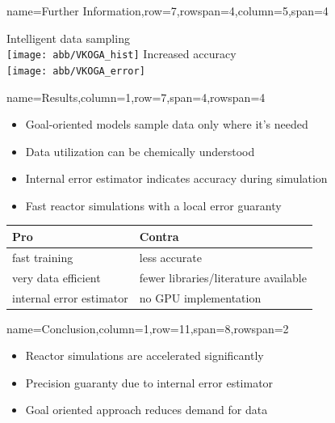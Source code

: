 \documentclass[
	accentcolor=3c,
	boxstyle=colored, %
	colorback=false,
	title=small
	]{tudasciposter}
\begin{document}
\begin{tcbposter}[
	poster={
		columns=8,
		rows=12,
		spacing=1cm,
	},]
\begin{posterboxenv}{name=Further Information,row=7,rowspan=4,column=5,span=4}
	\begin{multicols}{2}
		{\Large \centering Intelligent data sampling\\}
		\vspace{2cm}
		\texttt{[image: abb/VKOGA\_hist]}
		\columnbreak
		{\Large \centering Increased accuracy\\}
		\vspace{2cm}
		\texttt{[image: abb/VKOGA\_error]} %
	\end{multicols}	
\end{posterboxenv}

\begin{posterboxenv}[title=3. Results]{name=Results,column=1,row=7,span=4,rowspan=4}
	\begin{itemize}
		\item Goal-oriented models sample data only where it's needed
		\item Data utilization can be chemically understood
		\item Internal error estimator indicates accuracy during simulation
		\item Fast reactor simulations with a local error guaranty
	\end{itemize}
	\vspace{2cm}
	\begin{tabularx}{\textwidth}{XX}
		\toprule
		Pro & Contra \\ \midrule
		fast training & less accurate \\ 
		very data efficient & fewer libraries/literature available\\
		internal error estimator & no GPU implementation\\		
		\bottomrule
	\end{tabularx}%
	


\end{posterboxenv}

\begin{posterboxenv}[title=4. Conclusion]{name=Conclusion,column=1,row=11,span=8,rowspan=2}
\begin{multicols}{2}		
	\begin{itemize}
		\item Reactor simulations are accelerated significantly
		\item Precision guaranty due to internal error estimator
		\item Goal oriented approach reduces demand for data
	\end{itemize}
\end{multicols}


\end{posterboxenv}
\end{tcbposter}
\end{document}
